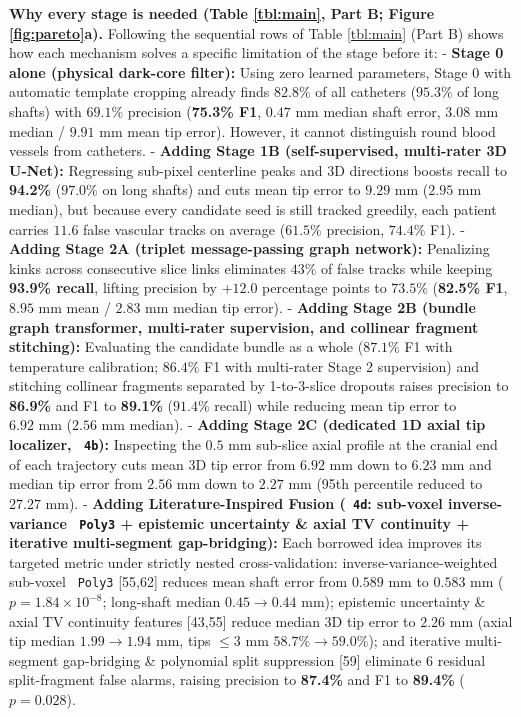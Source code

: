 \documentclass[
  11pt,
]{article}
\let\nforigtexttt\texttt
\renewcommand{\texttt}[1]{\nforigtexttt{\XeTeXinterchartokenstate=1 #1}}
\begin{document}
\textbf{Why every stage is needed (Table \ref{tbl:main}, Part B; Figure
\ref{fig:pareto}a).} Following the sequential rows of Table
\ref{tbl:main} (Part B) shows how each mechanism solves a specific
limitation of the stage before it: - \textbf{Stage 0 alone (physical
dark-core filter):} Using zero learned parameters, Stage 0 with
automatic template cropping already finds \(82.8\%\) of all catheters
(\(95.3\%\) of long shafts) with \(69.1\%\) precision (\textbf{75.3\%
F1}, \(0.47\text{ mm}\) median shaft error, \(3.08\text{ mm}\) median /
\(9.91\text{ mm}\) mean tip error). However, it cannot distinguish round
blood vessels from catheters. - \textbf{Adding Stage 1B
(self-supervised, multi-rater 3D U-Net):} Regressing sub-pixel
centerline peaks and 3D directions boosts recall to \textbf{94.2\%}
(\(97.0\%\) on long shafts) and cuts mean tip error to
\(9.29\text{ mm}\) (\(2.95\text{ mm}\) median), but because every
candidate seed is still tracked greedily, each patient carries \(11.6\)
false vascular tracks on average (\(61.5\%\) precision, \(74.4\%\) F1).
- \textbf{Adding Stage 2A (triplet message-passing graph network):}
Penalizing kinks across consecutive slice links eliminates \(43\%\) of
false tracks while keeping \textbf{93.9\% recall}, lifting precision by
\(+12.0\) percentage points to \(73.5\%\) (\textbf{82.5\% F1},
\(8.95\text{ mm}\) mean / \(2.83\text{ mm}\) median tip error). -
\textbf{Adding Stage 2B (bundle graph transformer, multi-rater
supervision, and collinear fragment stitching):} Evaluating the
candidate bundle as a whole (\(87.1\%\) F1 with temperature calibration;
\(86.4\%\) F1 with multi-rater Stage 2 supervision) and stitching
collinear fragments separated by 1-to-3-slice dropouts raises precision
to \textbf{86.9\%} and F1 to \textbf{89.1\%} (\(91.4\%\) recall) while
reducing mean tip error to \(6.92\text{ mm}\) (\(2.56\text{ mm}\)
median). - \textbf{Adding Stage 2C (dedicated 1D axial tip localizer,
\texttt{4b}):} Inspecting the \(0.5\text{ mm}\) sub-slice axial profile
at the cranial end of each trajectory cuts mean 3D tip error from
\(6.92\text{ mm}\) down to \textbf{\(6.23\text{ mm}\)} and median tip
error from \(2.56\text{ mm}\) down to \textbf{\(2.27\text{ mm}\)} (95th
percentile reduced to \(27.27\text{ mm}\)). - \textbf{Adding
Literature-Inspired Fusion (\texttt{4d}: sub-voxel inverse-variance
\texttt{Poly3} + epistemic uncertainty \& axial TV continuity +
iterative multi-segment gap-bridging):} Each borrowed idea improves its
targeted metric under strictly nested cross-validation:
inverse-variance-weighted sub-voxel \texttt{Poly3} {[}55,62{]} reduces
mean shaft error from \(0.589\text{ mm}\) to
\textbf{\(0.583\text{ mm}\)} (\(p = 1.84 \times 10^{-8}\); long-shaft
median \(0.45 \to 0.44\text{ mm}\)); epistemic uncertainty \& axial TV
continuity features {[}43,55{]} reduce median 3D tip error to
\textbf{\(2.26\text{ mm}\)} (axial tip median
\(1.99 \to 1.94\text{ mm}\), tips \(\le 3\text{ mm}\)
\(58.7\% \to 59.0\%\)); and iterative multi-segment gap-bridging \&
polynomial split suppression {[}59{]} eliminate 6 residual
split-fragment false alarms, raising precision to \textbf{87.4\%} and F1
to \textbf{89.4\%} (\(p = 0.028\)).
\end{document}
